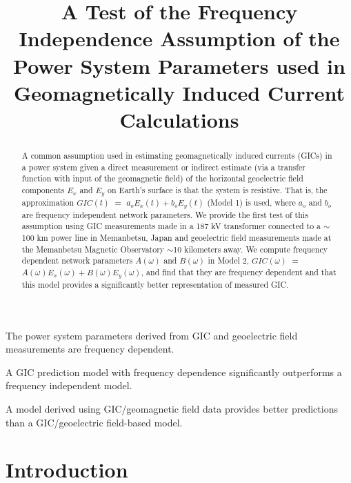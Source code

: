 \documentclass[draft,linenumbers]{agujournal2018}
\begin{document}

\title{A Test of the Frequency Independence Assumption of the Power System Parameters used in Geomagnetically Induced Current Calculations}





\begin{keypoints}
\item The power system parameters derived from GIC and geoelectric field measurements are frequency dependent.
\item A GIC prediction model with frequency dependence significantly outperforms a frequency independent model.
\item A model derived using GIC/geomagnetic field data provides better predictions than a GIC/geoelectric field-based model.
\end{keypoints}

\begin{abstract}
A common assumption used in estimating geomagnetically induced currents (GICs) in a power system given a direct measurement or indirect estimate (via a transfer function with input of the geomagnetic field) of the horizontal geoelectric field components $E_x$ and $E_y$ on Earth's surface is that the system is resistive. That is, the approximation $GIC(t)$  $=$ $a_oE_x(t) + b_oE_y(t)$ (Model 1) is used, where $a_o$ and $b_o$ are frequency independent network parameters.  We provide the first test of this assumption using GIC measurements made in a 187 kV transformer connected to a $\sim$100 km power line in Memanbetsu, Japan and geoelectric field measurements made at the Memanbetsu Magnetic Observatory $\sim$10 kilometers away.  We compute frequency dependent network parameters $A(\omega)$ and $B(\omega)$ in Model 2, $GIC(\omega)$ $=$ $A(\omega)E_x(\omega) + B(\omega)E_y(\omega)$, and find that they are frequency dependent and that this model provides a significantly better representation of measured GIC.
\end{abstract}

\section{Introduction}
\end{document}

